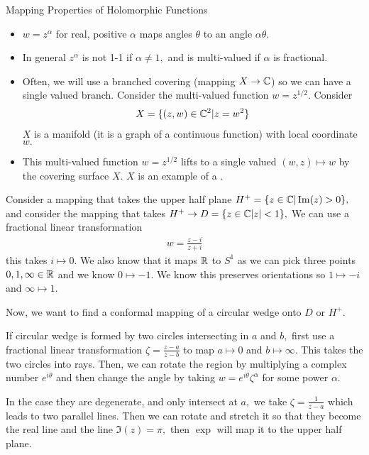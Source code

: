 \documentclass[a4paper,12pt]{article}
\begin{document}
Mapping Properties of Holomorphic Functions
\begin{itemize}
    \item $w=z^\alpha$ for real, positive $\alpha$ maps angles $\theta$ to an angle $\alpha\theta.$
    \item In general $z^\alpha$ is not 1-1 if $\alpha\neq1,$ and is multi-valued if $\alpha$ is fractional.
    \item Often, we will use a branched covering (mapping $X\to\mathbb{C}$) so we can have a single valued branch. Consider the multi-valued function $w=z^{1/2}.$ Consider \begin{align}
        X=\{(z,w)\in\mathbb{C}^2|z=w^2\}
    \end{align}
    $X$ is a manifold (it is a graph of a continuous function) with local coordinate $w.$
    \item This multi-valued function $w=z^{1/2}$ lifts to a single valued $(w,z)\mapsto w$ by the covering surface $X.$ $X$ is an example of a .
\end{itemize}

Consider a mapping that takes the upper half plane $H^+=\{z\in\mathbb{C}|\Im(z)>0\},$ and consider the mapping that takes $H^+\to D=\{z\in\mathbb{C}|z|<1\},$ We can use a fractional linear transformation \begin{align}
    w=\frac{z-i}{z+i}
\end{align}
this takes $i\mapsto0.$ We also know that it maps $\mathbb{R}$ to $S^1$ as we can pick three points $0,1,\infty\in\mathbb{R}$ and we know $0\mapsto-1.$ We know this preserves orientations so $1\mapsto-i$ and $\infty\mapsto1.$

Now, we want to find a conformal mapping of a circular wedge onto $D$ or $H^+.$

If  circular wedge is formed by two circles intersecting in $a$ and $b,$ first use a fractional linear transformation $\zeta=\frac{z-a}{z-b}$ to map $a\mapsto0$ and $b\mapsto\infty.$ This takes the two circles into rays. Then, we can rotate the region by multiplying a complex number $e^{i\theta}$ and then change the angle by taking $w=e^{i\theta}\zeta^\alpha$ for some power $\alpha.$

In the case they are degenerate, and only intersect at $a,$ we take $\zeta=\frac{1}{z-a}$ which leads to two parallel lines. Then we can rotate and stretch it so that they become the real line and the line $\Im(z)=\pi,$ then $\exp$ will map it to the upper half plane.
\end{document}
